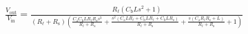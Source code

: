 $\frac{V_{\mathrm{out}}}{V_{\mathrm{in}}}=\frac{R_{\ell} \left(C_{\mathrm{b}} L s^{2} + 1\right)}{\left(R_{\ell} + R_{\mathrm{s}}\right) \left(\frac{C_{\mathrm{a}} C_{\mathrm{b}} L R_{\ell} R_{\mathrm{s}} s^{3}}{R_{\ell} + R_{\mathrm{s}}} + \frac{s^{2} \left(C_{\mathrm{a}} L R_{\ell} + C_{\mathrm{b}} L R_{\ell} + C_{\mathrm{b}} L R_{\mathrm{s}}\right)}{R_{\ell} + R_{\mathrm{s}}} + \frac{s \left(C_{\mathrm{a}} R_{\ell} R_{\mathrm{s}} + L\right)}{R_{\ell} + R_{\mathrm{s}}} + 1\right)}$ 